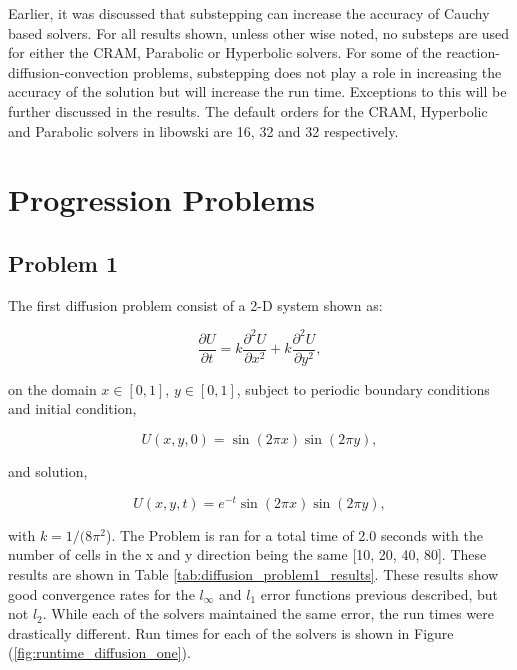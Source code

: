 Earlier, it was discussed that substepping can increase the accuracy of Cauchy based solvers. For all results shown, unless other wise noted, no substeps are used for either the CRAM, Parabolic or Hyperbolic solvers. For some of the reaction-diffusion-convection problems, substepping does not play a role in increasing the accuracy of the solution but will increase the run time. Exceptions to this will be further discussed in the results. The default orders for the CRAM, Hyperbolic and Parabolic solvers in libowski are 16, 32 and 32 respectively. 

\section{Progression Problems}
\subsection{Problem 1}
The first diffusion problem consist of a 2-D system shown as:

\begin{equation}
    \frac{\partial U}{\partial t} = k\frac{\partial^{2}U}{\partial x^{2}} + k\frac{\partial^{2}U}{\partial y^{2}},
\end{equation}

\noindent on the domain $x \in [0,1]$, $y \in [0,1]$, subject to periodic boundary conditions and initial condition,


\begin{equation}
    U(x,y,0) = \sin(2\pi x)\sin(2\pi y),
\end{equation}

\noindent and solution,

\begin{equation}
    U(x,y,t) = e^{-t}\sin(2\pi x)\sin(2\pi y),
\end{equation}

\noindent with $k = 1/(8\pi^{2}$). The Problem is ran for a total time of 2.0 seconds with the number of cells in the x and y direction being the same [10, 20, 40, 80]. These results are shown in Table \ref{tab:diffusion_problem1_results}. These results show good convergence rates for the $l_{\infty}$ and $l_{1}$ error functions previous described, but not $l_{2}$. While each of the solvers maintained the same error, the run times were drastically different. Run times for each of the solvers is shown in Figure (\ref{fig:runtime_diffusion_one}).

